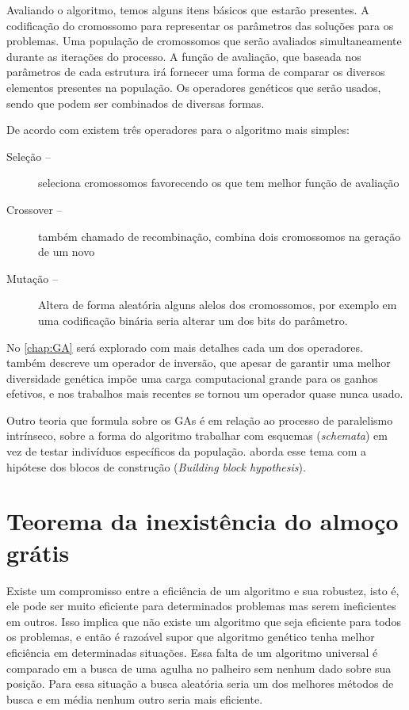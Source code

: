 Avaliando o algoritmo, temos alguns itens básicos que estarão presentes. A codificação do cromossomo para representar os parâmetros das soluções para os problemas. Uma população de cromossomos que serão avaliados simultaneamente durante as iterações do processo. A função de avaliação, que baseada nos parâmetros de cada estrutura irá fornecer uma forma de comparar os diversos elementos presentes na população. Os operadores genéticos que serão usados, sendo que podem ser combinados de diversas formas. 

De acordo com \citeauthor{Mitchell1996} existem três operadores para o algoritmo mais simples:
\begin{description}
	\item[Seleção --] seleciona cromossomos favorecendo os que tem melhor função de avaliação
	\item[Crossover --] também chamado de recombinação, combina dois cromossomos na geração de um novo
	\item[Mutação --] Altera de forma aleatória alguns alelos dos cromossomos, por exemplo em uma codificação binária seria alterar um dos bits do parâmetro.
\end{description}

No \autoref{chap:GA} será explorado com mais detalhes cada um dos operadores. \citeauthor{Holland1992} também descreve um operador de inversão, que apesar de garantir uma melhor diversidade genética impõe uma carga computacional grande para os ganhos efetivos, e nos trabalhos mais recentes se tornou um operador quase nunca usado.

Outro teoria que \citeauthor{Holland1992} formula sobre os GAs é em relação ao processo de paralelismo intrínseco, sobre a forma do algoritmo trabalhar com esquemas (\textit{schemata}) em vez de testar indivíduos específicos da população. \citeauthor{Goldberg1989} aborda esse tema com a hipótese dos blocos de construção (\textit{Building block hypothesis}).

\section {Teorema da inexistência do almoço grátis}
Existe um compromisso entre a eficiência de um algoritmo e sua robustez, isto é, ele pode ser muito eficiente para determinados problemas mas serem ineficientes em outros. Isso implica que não existe um algoritmo que seja eficiente para todos os problemas, e então é razoável supor que algoritmo genético tenha melhor eficiência em determinadas situações. Essa falta de um algoritmo universal é comparado em \cite{Spall2003} a busca de uma agulha no palheiro sem nenhum dado sobre sua posição. Para essa situação a busca aleatória seria um dos melhores métodos de busca e em média nenhum outro seria mais eficiente.

